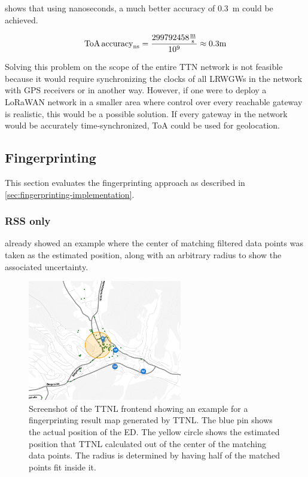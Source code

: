  shows that using nanoseconds, a much better accuracy of \SI{0.3}{\meter} could be achieved.

\begin{equation}\label{eq:toa-accuracy-ttn-nanoseconds}
    \text{ToA\,accuracy}_{\si{\nano\second}} = \frac{299792458 \frac{\si{\meter}}{\si{\second}}}{10^9} \approx 0.3 \si{\meter}
\end{equation}

Solving this problem on the scope of the entire \ac{TTN} network is not feasible because it would require synchronizing the clocks of all \aclp{LRWGW} in the network with \ac{GPS} receivers or in another way.
However, if one were to deploy a \ac{LoRaWAN} network in a smaller area where control over every reachable gateway is realistic, this would be a possible solution.
If every gateway in the network would be accurately time-synchronized, \ac{ToA} could be used for geolocation.

\subsection{Fingerprinting}\label{subsec:conclusion-fingerprinting}

This section evaluates the fingerprinting approach as described in \cref{sec:fingerprinting-implementation}.

\subsubsection{\acl{RSS} only}

 already showed an example where the center of matching filtered data points was taken as the estimated position, along with an arbitrary radius to show the associated uncertainty.

\begin{figure}[htbp]
    \centering
    \includegraphics[width=0.6\textwidth]{pictures/ttn-locator/frontend/fingerprinting/rssi_similarity_map_example_dynamic_radius.png}
    \caption{
        Screenshot of the \ac{TTNL} frontend showing an example for a fingerprinting result map generated by \ac{TTNL}.
        The blue pin shows the actual position of the \acl{ED}.
        The yellow circle shows the estimated position that \ac{TTNL} calculated out of the center of the matching data points.
        The radius is determined by having half of the matched points fit inside it.
    }\label{fig:fingerprinting-map-example-dynamic-radius}
\end{figure}

